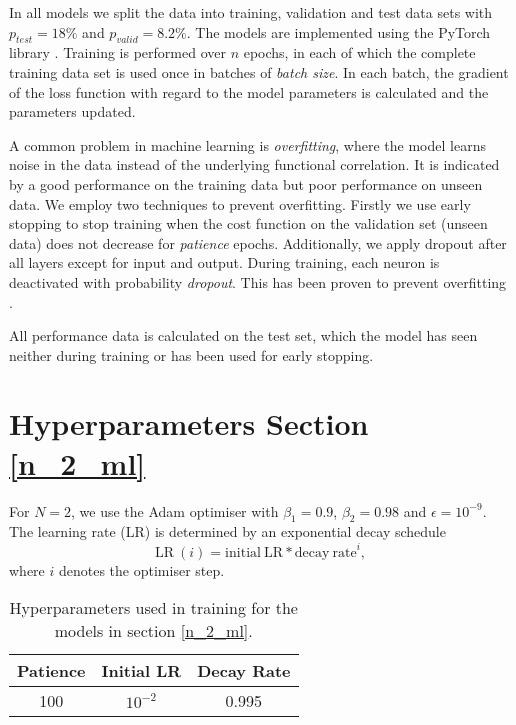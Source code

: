 In all models we split the data into training, validation and test data sets with $p_{test} = 18 \%$ and $p_{valid} = 8.2 \%$.
The models are implemented using the PyTorch library \cite{NEURIPS2019_9015}. 
Training is performed over $n$ epochs, in each of which the complete training data set is used once in batches of \textit{batch size}.
In each batch, the gradient of the loss function with regard to the model parameters is calculated and the parameters updated.

A common problem in machine learning is \textit{overfitting}, where the model learns noise in the data instead of the underlying functional correlation.
It is indicated by a good performance on the training data but poor performance on unseen data.
We employ two techniques to prevent overfitting.
Firstly we use early stopping to stop training when the cost function on the validation set (unseen data) does not decrease for \textit{patience} epochs.
Additionally, we apply dropout after all layers except for input and output.
During training, each neuron is deactivated with probability \textit{dropout}.
This has been proven to prevent overfitting \cite{hinton2012improving}.

All performance data is calculated on the test set, which the model has seen neither during training or has been used for early stopping.

\section{Hyperparameters Section \ref{n_2_ml}}
For $N=2$, we use the Adam \cite{kingma2017adam} optimiser with $\beta_1 = 0.9$, $\beta_2 = 0.98$ and $\epsilon = 10^{-9}$. The learning rate (LR) is determined by an exponential decay schedule
\begin{equation} \label{eds}
\mathrm{LR} \ (i) = \mathrm{initial \ LR} * \mathrm{decay \ rate}^i,
\end{equation}
where $i$ denotes the optimiser step.


\begin{table}[h]
	\centering
	\begin{tabular}{c | c | c }
		Patience & Initial LR & Decay Rate \\
		\hline
		100 & $10^{-2}$ & 0.995 \\
	\end{tabular}
	\caption{Hyperparameters used in training for the models in section \ref{n_2_ml}.}
	\label{hyperparams_n_2}
\end{table}

